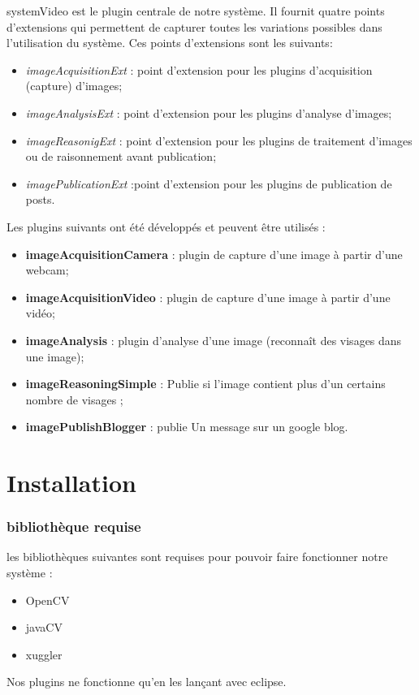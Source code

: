 \documentclass[a4paper , 12pt]{article}
\begin{document}
systemVideo est le plugin centrale de notre système. Il fournit quatre points d'extensions qui permettent de capturer toutes les variations possibles dans l'utilisation du système. Ces points d'extensions sont les suivants:
 
\begin{itemize}
\item {\it imageAcquisitionExt} : point d'extension pour les plugins d'acquisition (capture) d'images; 
\item {\it imageAnalysisExt} : point d'extension pour les plugins d'analyse d'images;
\item {\it imageReasonigExt} : point d'extension pour les plugins de traitement d'images ou de raisonnement avant publication; 
\item {\it imagePublicationExt} :point d'extension pour les plugins de publication de posts.
\end{itemize}  
Les plugins suivants ont été développés et peuvent être utilisés : 
\begin{itemize}
\item {\bf imageAcquisitionCamera} : plugin de capture d'une image à partir d'une webcam; 
\item {\bf imageAcquisitionVideo} :  plugin de capture d'une image à partir d'une vidéo;
\item {\bf imageAnalysis} : plugin d'analyse d'une image (reconnaît des visages dans une image); 
\item {\bf imageReasoningSimple} : Publie si l'image contient plus d'un certains nombre de visages ;
\item {\bf imagePublishBlogger} :  publie Un message sur un google blog.
\end{itemize}  

\part*{Installation}
\section{bibliothèque requise}
les bibliothèques suivantes sont requises pour pouvoir faire fonctionner notre système :
\begin{itemize}
\item OpenCV
\item javaCV
\item xuggler
\end{itemize}
Nos plugins ne fonctionne qu'en les lançant avec eclipse.
\end{document}
